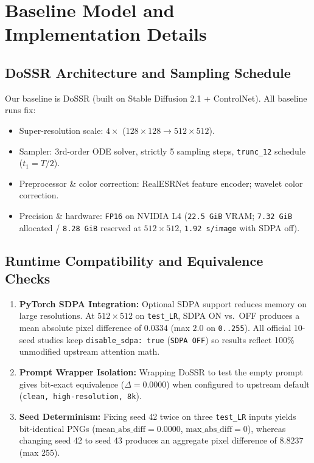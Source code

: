 \documentclass[11pt]{article}
\begin{document}
\section{Baseline Model and Implementation Details}
\subsection{DoSSR Architecture and Sampling Schedule}
Our baseline is DoSSR (built on Stable Diffusion 2.1 + ControlNet). All baseline runs fix:
\begin{itemize}
    \item Super-resolution scale: $4\times$ ($128\times 128 \to 512\times 512$).
    \item Sampler: 3rd-order ODE solver, strictly 5 sampling steps, \texttt{trunc\_12} schedule ($t_1 = T/2$).
    \item Preprocessor \& color correction: RealESRNet feature encoder; wavelet color correction.
    \item Precision \& hardware: \texttt{FP16} on NVIDIA L4 (\texttt{22.5~GiB} VRAM; \texttt{7.32~GiB} allocated / \texttt{8.28~GiB} reserved at $512\times 512$, \texttt{1.92~s/image} with SDPA off).
\end{itemize}

\subsection{Runtime Compatibility and Equivalence Checks}
\begin{enumerate}
    \item \textbf{PyTorch SDPA Integration:} Optional SDPA support reduces memory on large resolutions. At $512\times 512$ on \texttt{test\_LR}, SDPA ON vs.\ OFF produces a mean absolute pixel difference of $0.0334$ (max $2.0$ on \texttt{0..255}). All official 10-seed studies keep \texttt{disable\_sdpa: true} (\texttt{SDPA OFF}) so results reflect 100\% unmodified upstream attention math.
    \item \textbf{Prompt Wrapper Isolation:} Wrapping DoSSR to test the empty prompt gives bit-exact equivalence ($\Delta = 0.0000$) when configured to upstream default (\texttt{clean, high-resolution, 8k}).
    \item \textbf{Seed Determinism:} Fixing seed 42 twice on three \texttt{test\_LR} inputs yields bit-identical PNGs ($\text{mean\_abs\_diff} = 0.0000$, $\text{max\_abs\_diff} = 0$), whereas changing seed 42 to seed 43 produces an aggregate pixel difference of $8.8237$ (max $255$).
\end{enumerate}
\end{document}
